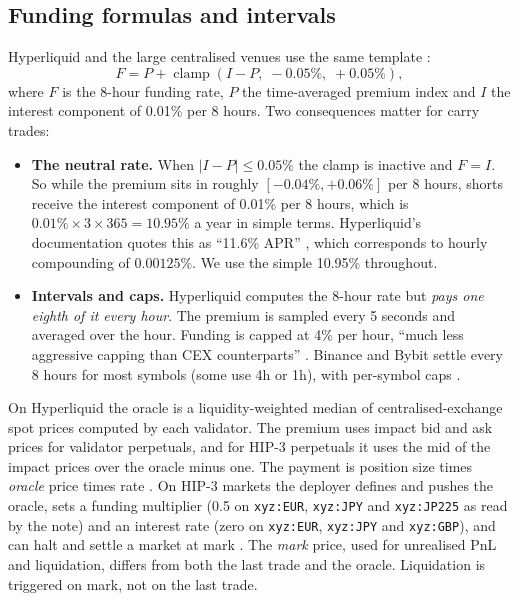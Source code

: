 \documentclass[11pt,a4paper]{article}
\begin{document}
\subsection{Funding formulas and intervals}
Hyperliquid and the large centralised venues use the same template \citep{hl_funding,binance_funding}:
\begin{equation}
F = P + \operatorname{clamp}\!\left(I - P,\; -0.05\%,\; +0.05\%\right),
\label{eq:funding}
\end{equation}
where $F$ is the 8-hour funding rate, $P$ the time-averaged premium index and $I$ the interest component of 0.01\% per 8 hours.
Two consequences matter for carry trades:
\begin{itemize}
\item \textbf{The neutral rate.} When $|I-P|\le 0.05\%$ the clamp is inactive and $F=I$. So while the premium sits in roughly $[-0.04\%, +0.06\%]$ per 8 hours, shorts receive the interest component of 0.01\% per 8 hours, which is $0.01\% \times 3 \times 365 = 10.95\%$ a year in simple terms. Hyperliquid's documentation quotes this as ``11.6\% APR'' \citep{hl_funding}, which corresponds to hourly compounding of $0.00125\%$. We use the simple 10.95\% throughout.
\item \textbf{Intervals and caps.} Hyperliquid computes the 8-hour rate but \emph{pays one eighth of it every hour}. The premium is sampled every 5 seconds and averaged over the hour. Funding is capped at 4\% per hour, ``much less aggressive capping than CEX counterparts'' \citep{hl_funding}. Binance and Bybit settle every 8 hours for most symbols (some use 4h or 1h), with per-symbol caps \citep{binance_funding}.
\end{itemize}
On Hyperliquid the oracle is a liquidity-weighted median of centralised-exchange spot prices computed by each validator. The premium uses impact bid and ask prices for validator perpetuals, and for HIP-3 perpetuals it uses the mid of the impact prices over the oracle minus one. The payment is position size times \emph{oracle} price times rate \citep{hl_funding}.
On HIP-3 markets the deployer defines and pushes the oracle, sets a funding multiplier (0.5 on \texttt{xyz:EUR}, \texttt{xyz:JPY} and \texttt{xyz:JP225} as read by the note) and an interest rate (zero on \texttt{xyz:EUR}, \texttt{xyz:JPY} and \texttt{xyz:GBP}), and can halt and settle a market at mark \citep{hl_hip3}.
The \emph{mark} price, used for unrealised PnL and liquidation, differs from both the last trade and the oracle. Liquidation is triggered on mark, not on the last trade.
\end{document}
